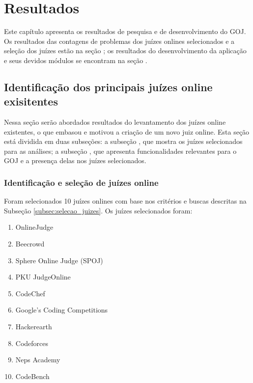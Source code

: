 \chapter{Resultados}
\label{cap:resultados}

Este capítulo apresenta os resultados de pesquisa e de desenvolvimento do GOJ. Os resultados das contagens de problemas dos juízes onlines selecionados e a seleção dos juízes estão na seção ; os resultados do desenvolvimento da aplicação e seus devidos módulos se encontram na seção .

\section{Identificação dos principais juízes online exisitentes}
\label{sec:pesquisa_juizes}

Nessa seção serão abordados resultados do levantamento dos juízes online existentes, o que embasou e motivou a criação de um novo juiz online. Esta seção está dividida em duas subseções: a subseção , que mostra os juízes selecionados para as análises; a subseção , que apresenta funcionalidades relevantes para o GOJ e a presença delas nos juízes selecionados.

\subsection{Identificação e seleção de juízes online}
\label{subsec:resultados_selecao_juizes}

Foram selecionados 10 juízes onlines com base nos critérios e buscas descritas na Subseção \ref{subsec:selecao_juizes}. Os juízes selecionados foram:

\begin{enumerate}
    \item OnlineJudge
    \item Beecrowd
    \item Sphere Online Judge (SPOJ)
    \item PKU JudgeOnline
    \item CodeChef
    \item Google's Coding Competitions
    \item Hackerearth
    \item Codeforces
    \item Neps Academy 
    \item CodeBench
\end{enumerate}

